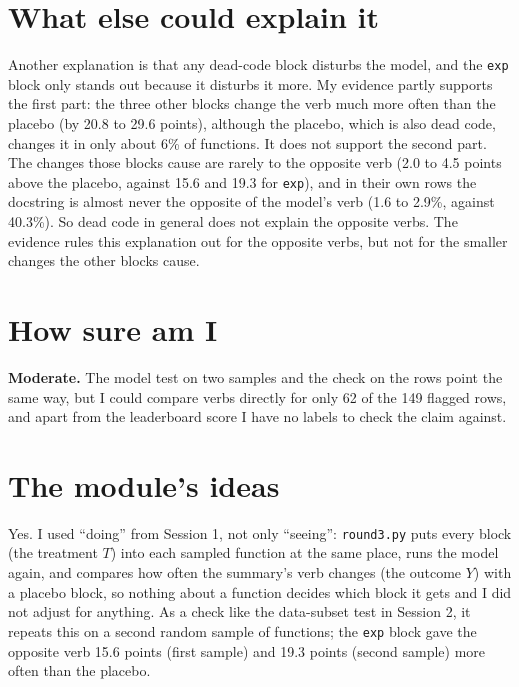 \documentclass{article}
\newcommand{\code}[1]{\texttt{#1}}
\begin{document}
\section{What else could explain it}

Another explanation is that any dead-code block disturbs the model, and the \code{exp} block only
stands out because it disturbs it more. My evidence partly supports the first part: the three other
blocks change the verb much more often than the placebo (by 20.8 to 29.6 points), although the placebo,
which is also dead code, changes it in only about 6\% of functions. It does not support the second
part. The changes those blocks cause are rarely to the opposite verb (2.0 to 4.5 points above
the placebo, against 15.6 and 19.3 for \code{exp}), and in their own rows the docstring is almost never
the opposite of the model's verb (1.6 to 2.9\%, against 40.3\%). So dead code in general does not
explain the opposite verbs. The evidence rules this explanation out for the opposite verbs, but not
for the smaller changes the other blocks cause.

\section{How sure am I}

\textbf{Moderate.} The model test on two samples and the check on the rows point the same way, but I
could compare verbs directly for only 62 of the 149 flagged rows, and apart from the leaderboard score
I have no labels to check the claim against.

\section{The module's ideas}

Yes. I used ``doing'' from Session 1, not only ``seeing'': \code{round3.py} puts every block (the
treatment $T$) into each sampled function at the same place, runs the model again, and compares how
often the summary's verb changes (the outcome $Y$) with a placebo block, so nothing about a function
decides which block it gets and I did not adjust for anything. As a check like the data-subset test in
Session 2, it repeats this on a second random sample of functions; the \code{exp} block gave the
opposite verb 15.6 points (first sample) and 19.3 points (second sample) more often than the placebo.
\end{document}
